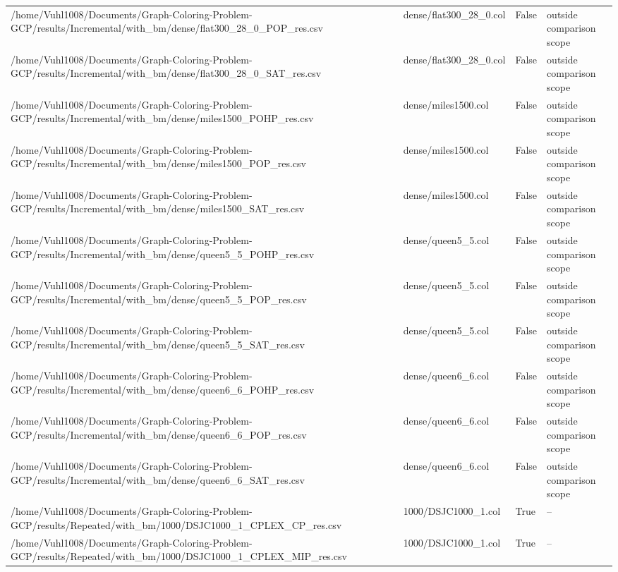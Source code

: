 \begin{table}[htbp]
\begin{tabular}{llll}
/home/Vuhl1008/Documents/Graph-Coloring-Problem-GCP/results/Incremental/with\_bm/dense/flat300\_28\_0\_POP\_res.csv & dense/flat300\_28\_0.col & False & outside comparison scope \\
/home/Vuhl1008/Documents/Graph-Coloring-Problem-GCP/results/Incremental/with\_bm/dense/flat300\_28\_0\_SAT\_res.csv & dense/flat300\_28\_0.col & False & outside comparison scope \\
/home/Vuhl1008/Documents/Graph-Coloring-Problem-GCP/results/Incremental/with\_bm/dense/miles1500\_POHP\_res.csv & dense/miles1500.col & False & outside comparison scope \\
/home/Vuhl1008/Documents/Graph-Coloring-Problem-GCP/results/Incremental/with\_bm/dense/miles1500\_POP\_res.csv & dense/miles1500.col & False & outside comparison scope \\
/home/Vuhl1008/Documents/Graph-Coloring-Problem-GCP/results/Incremental/with\_bm/dense/miles1500\_SAT\_res.csv & dense/miles1500.col & False & outside comparison scope \\
/home/Vuhl1008/Documents/Graph-Coloring-Problem-GCP/results/Incremental/with\_bm/dense/queen5\_5\_POHP\_res.csv & dense/queen5\_5.col & False & outside comparison scope \\
/home/Vuhl1008/Documents/Graph-Coloring-Problem-GCP/results/Incremental/with\_bm/dense/queen5\_5\_POP\_res.csv & dense/queen5\_5.col & False & outside comparison scope \\
/home/Vuhl1008/Documents/Graph-Coloring-Problem-GCP/results/Incremental/with\_bm/dense/queen5\_5\_SAT\_res.csv & dense/queen5\_5.col & False & outside comparison scope \\
/home/Vuhl1008/Documents/Graph-Coloring-Problem-GCP/results/Incremental/with\_bm/dense/queen6\_6\_POHP\_res.csv & dense/queen6\_6.col & False & outside comparison scope \\
/home/Vuhl1008/Documents/Graph-Coloring-Problem-GCP/results/Incremental/with\_bm/dense/queen6\_6\_POP\_res.csv & dense/queen6\_6.col & False & outside comparison scope \\
/home/Vuhl1008/Documents/Graph-Coloring-Problem-GCP/results/Incremental/with\_bm/dense/queen6\_6\_SAT\_res.csv & dense/queen6\_6.col & False & outside comparison scope \\
/home/Vuhl1008/Documents/Graph-Coloring-Problem-GCP/results/Repeated/with\_bm/1000/DSJC1000\_1\_CPLEX\_CP\_res.csv & 1000/DSJC1000\_1.col & True & -- \\
/home/Vuhl1008/Documents/Graph-Coloring-Problem-GCP/results/Repeated/with\_bm/1000/DSJC1000\_1\_CPLEX\_MIP\_res.csv & 1000/DSJC1000\_1.col & True & -- \\

\end{tabular}
\end{table}
